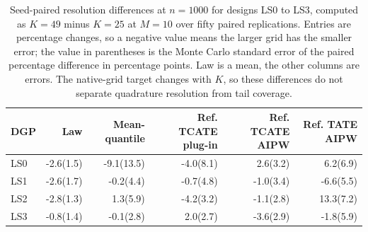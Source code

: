 \begin{table}[!ht]
\centering
\scriptsize
\setlength{\tabcolsep}{3pt}
\caption{Seed-paired resolution differences at $n=1000$ for designs LS0 to LS3, computed as $K=49$ minus $K=25$ at $M=10$ over fifty paired replications. Entries are percentage changes, so a negative value means the larger grid has the smaller error; the value in parentheses is the Monte Carlo standard error of the paired percentage difference in percentage points. Law is a mean, the other columns are errors. The native-grid target changes with $K$, so these differences do not separate quadrature resolution from tail coverage.}
\label{tab:sensitivity-resolution}
\begin{tabular}{lrrrrr}
\toprule
DGP & Law & Mean-quantile & Ref. TCATE plug-in & Ref. TCATE AIPW & Ref. TATE AIPW \\
\midrule
LS0 & -2.6(1.5) & -9.1(13.5) & -4.0(8.1) & 2.6(3.2) & 6.2(6.9) \\
LS1 & -2.6(1.7) & -0.2(4.4) & -0.7(4.8) & -1.0(3.4) & -6.6(5.5) \\
LS2 & -2.8(1.3) & 1.3(5.9) & -4.2(3.2) & -1.1(2.8) & 13.3(7.2) \\
LS3 & -0.8(1.4) & -0.1(2.8) & 2.0(2.7) & -3.6(2.9) & -1.8(5.9) \\
\bottomrule
\end{tabular}
\end{table}
